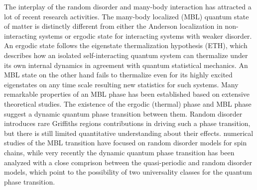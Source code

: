 \documentclass[prl,aps,epsf,showpacs,twocolumn]{revtex4}
\begin{document}
The interplay of the random disorder and  many-body interaction  has attracted a
lot of recent research
activities\cite{basko2006,oganesyan2007,pal2010,znidaric2008,
huse2013,nandkishore2015,altman2015,huse2014,nandkishore2014,
pekker_hilbert2014}.  The many-body localized (MBL) quantum
state\cite{nandkishore2015,altman2015,huse2014,nandkishore2014,
pekker_hilbert2014} of matter is distinctly different from either the  Anderson
localization in non-interacting systems or ergodic state for interacting systems
with weaker disorder.  An ergodic state  follows the eigenstate thermalization
hypothesis (ETH), which  describes how an isolated self-interacting quantum
system can thermalize under its own internal dynamics in agreement with quantum
statistical mechanics\cite{deutsch1991,srednicki1994,rigol2008}.  An MBL  state
on the other hand  fails to thermalize even for its highly excited eigenstates
on any time scale  resulting new statistics for such
systems\cite{basko2006,oganesyan2007,pal2010,znidaric2008,
huse2013,nandkishore2015,altman2015,huse2014,nandkishore2014,
pekker_hilbert2014}.  Many remarkable properties of an MBL phase has been
established\cite{nandkishore2015,altman2015,huse2013,
  nandkishore2014,oganesyan2007,pal2010,znidaric2008, rigol2008,
  serbyn2014,kwasigroch2014,yao2014,vasseur2015, huse2014,
  serbyn2013,ros2015,chandran2014,grover2014,agarwal2015,
  knap2015,luitz2015,devakul2015,torres2015,
  canovi2011,cuevas2012,bauer2013,kjall2014,luca2013,iyer2013,pekker_hilbert2014,johri2014,bardarson2012,andraschko2014,laumann2014,hickey2014,nanduri2014,barlev2014,imbrie2014,groverf2014,ponte2015,
huang2015,you2015,serbyn2015,singh2015,barlev2015,deng2015,chen2015} based on
extensive theoretical studies.  The existence of the ergodic (thermal) phase and
MBL phase suggest a dynamic quantum phase transition between
them\cite{basko2006,pal2010,oganesyan2007,kjall2014,vosk_theory2014,potter2015trans,serbyn2015,agarwal2015,knap2015,lim2016,zhang2016,zhang2016a,yu2016,vedika2016,dumitrescu2017}.
Random disorder introduces rare Griffiths regions
contributions in driving such a phase transition, but there is still limited
quantitative understanding about their effects.  %
numerical studies of the MBL transition have focused on random disorder models
for spin chains\cite{pal2010,kjall2014,luitz2015,yu2016,vedika2016}, while very
recently the dynamic quantum phase transition has been analyzed with a close
comprison between the quasi-periodic and random disorder models, which point to
the possibility of two universality classes for the quantum phase
transition\cite{vedika2017,vedika2016}.
\end{document}
